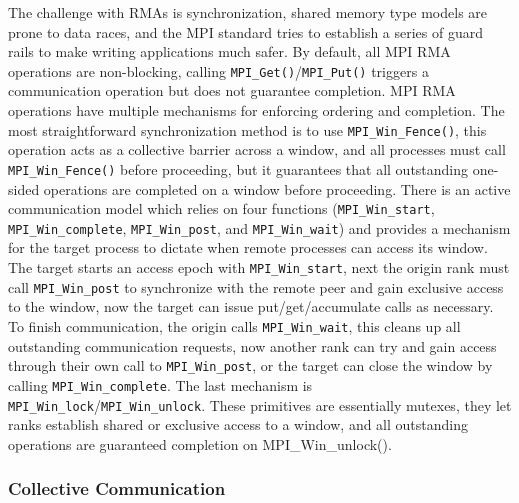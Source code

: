 The challenge with RMAs is synchronization, shared memory type models are prone to data races, and the MPI standard tries to establish a series of guard rails to make writing applications much safer.
By default, all MPI RMA operations are non-blocking, calling \texttt{MPI\_Get()}/\texttt{MPI\_Put()} triggers a communication operation but does not guarantee completion.
MPI RMA operations have multiple mechanisms for enforcing ordering and completion.
The most straightforward synchronization method is to use \texttt{MPI\_Win\_Fence()}, this operation acts as a collective barrier across a window, and all processes must call \texttt{MPI\_Win\_Fence()} before proceeding, but it guarantees that all outstanding one-sided operations are completed on a window before proceeding. 
There is an active communication model which relies on four functions (\texttt{MPI\_Win\_start}, \texttt{MPI\_Win\_complete}, \texttt{MPI\_Win\_post}, and \texttt{MPI\_Win\_wait}) and provides a mechanism for the target process to dictate when remote processes can access its window.
The target starts an access epoch with \texttt{MPI\_Win\_start}, next the origin rank must call \texttt{MPI\_Win\_post} to synchronize with the remote peer and gain exclusive access to the window, now the target can issue put/get/accumulate calls as necessary.
To finish communication, the origin calls \texttt{MPI\_Win\_wait}, this cleans up all outstanding communication requests, now another rank can try and gain access through their own call to \texttt{MPI\_Win\_post}, or the target can close the window by calling \texttt{MPI\_Win\_complete}.
The last mechanism is \texttt{MPI\_Win\_lock}/\texttt{MPI\_Win\_unlock}.
These primitives are essentially mutexes, they let ranks establish shared or exclusive access to a window, and all outstanding operations are guaranteed completion on MPI\_Win\_unlock().

\subsubsection{Collective Communication}



